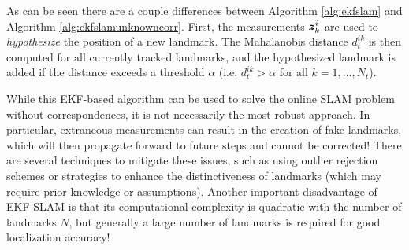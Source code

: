 As can be seen there are a couple differences between Algorithm \ref{alg:ekfslam} and Algorithm \ref{alg:ekfslamunknowncorr}. First, the measurements $\bm{z}_k^i$ are used to \textit{hypothesize} the position of a new landmark. The Mahalanobis distance $d_t^{ik}$ is then computed for all currently tracked landmarks, and the hypothesized landmark is added if the distance exceeds a threshold $\alpha$ (i.e. $d_t^{ik} > \alpha$ for all $k = 1,\dots,N_t$).


While this EKF-based algorithm can be used to solve the online SLAM problem without correspondences, it is not necessarily the most robust approach. In particular, extraneous measurements can result in the creation of fake landmarks, which will then propagate forward to future steps and cannot be corrected!
There are several techniques to mitigate these issues, such as using outlier rejection schemes or strategies to enhance the distinctiveness of landmarks (which may require prior knowledge or assumptions).
Another important disadvantage of EKF SLAM is that its computational complexity is quadratic with the number of landmarks $N$, but generally a large number of landmarks is required for good localization accuracy!



